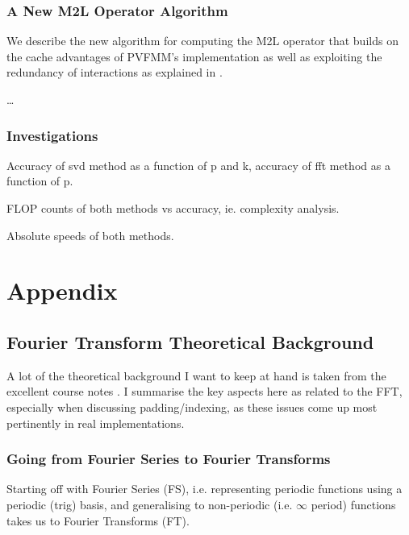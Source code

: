\documentclass[12pt, a4, twoside]{article}
\begin{document}
\subsubsection{A New M2L Operator Algorithm}

We describe the new algorithm for computing the M2L operator that builds on the cache advantages of PVFMM's implementation \cite{Malhotra2015} as well as exploiting the redundancy of interactions as explained in \cite{Messner2012}.


\dots


\subsubsection{Investigations}

\begin{list}{-}{Benchmark figures}
    \item Accuracy of svd method as a function of p and k, accuracy of fft method as a function of p.
    \item FLOP counts of both methods vs accuracy, ie. complexity analysis.
    \item Absolute speeds of both methods.
\end{list}

\section{Appendix}

\subsection{Fourier Transform Theoretical Background}

A lot of the theoretical background I want to keep at hand is taken from the excellent course notes \cite{Osgood2014}. I summarise the key aspects here as related to the FFT, especially when discussing padding/indexing, as these issues come up most pertinently in real implementations.

\subsubsection{Going from Fourier Series to Fourier Transforms}

Starting off with Fourier Series (FS), i.e. representing periodic functions using a periodic (trig) basis, and generalising to non-periodic (i.e. $\infty$ period) functions takes us to Fourier Transforms (FT).
\end{document}
